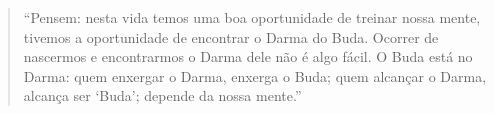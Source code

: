 

\cleartoverso

\begin{quote}
“Pensem: nesta vida temos uma boa oportunidade de treinar nossa mente,
tivemos a oportunidade de encontrar o Darma do Buda. Ocorrer de
nascermos e encontrarmos o Darma dele não é algo fácil. O Buda está no
Darma: quem enxergar o Darma, enxerga o Buda; quem alcançar o Darma,
alcança ser ‘Buda’; depende da nossa mente.”
\end{quote}

